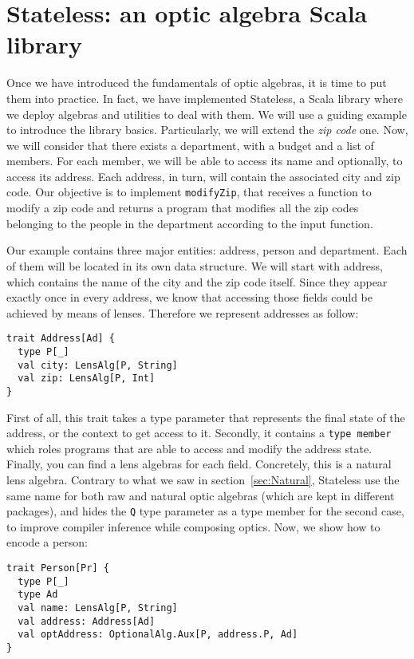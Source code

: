 \documentclass[preview, 3p]{elsarticle}
\begin{document}
\section{Stateless: an optic algebra Scala library}
\label{sec:Stateless}

Once we have introduced the fundamentals of optic algebras, it is time to put
them into practice. In fact, we have implemented Stateless, a Scala library
where we deploy algebras and utilities to deal with them. We will use a guiding
example to introduce the library basics. Particularly, we will extend the
\emph{zip code} one. Now, we will consider that there exists a department, with
a budget and a list of members. For each member, we will be able to access its
name and optionally, to access its address. Each address, in turn, will contain
the associated city and zip code. Our objective is to implement
\lstinline{modifyZip}, that receives a function to modify a zip code and returns
a program that modifies all the zip codes belonging to the people in the
department according to the input function.

Our example contains three major entities: address, person and department. Each
of them will be located in its own data structure. We will start with address,
which contains the name of the city and the zip code itself. Since they appear
exactly once in every address, we know that accessing those fields could be
achieved by means of lenses. Therefore we represent addresses as follow:

\begin{lstlisting}
trait Address[Ad] {
  type P[_]
  val city: LensAlg[P, String]
  val zip: LensAlg[P, Int]
}
\end{lstlisting}

First of all, this trait takes a type parameter that represents the final state
of the address, or the context to get access to it. Secondly, it contains a
\lstinline{type member} which roles programs that are able to access and modify
the address state. Finally, you can find a lens algebras for each field.
Concretely, this is a natural lens algebra. Contrary to what we saw in
section~\ref{sec:Natural}, Stateless use the same name for both raw and natural
optic algebras (which are kept in different packages), and hides the
\lstinline{Q} type parameter as a type member for the second case, to improve
compiler inference while composing optics. Now, we show how to encode a person:

\begin{lstlisting}
trait Person[Pr] {
  type P[_]
  type Ad
  val name: LensAlg[P, String]
  val address: Address[Ad]
  val optAddress: OptionalAlg.Aux[P, address.P, Ad]
}
\end{lstlisting}
\end{document}
